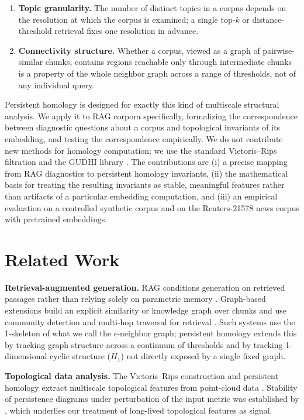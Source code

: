 \documentclass[11pt]{article}
\begin{document}
\begin{enumerate}
\item \textbf{Topic granularity.} The number of distinct topics in a corpus depends on the resolution at which the corpus is examined; a single top-$k$ or distance-threshold retrieval fixes one resolution in advance.
\item \textbf{Connectivity structure.} Whether a corpus, viewed as a graph of pairwise-similar chunks, contains regions reachable only through intermediate chunks is a property of the whole neighbor graph across a range of thresholds, not of any individual query.
\end{enumerate}

Persistent homology \citep{edelsbrunner2008persistent, zomorodian2005computing} is designed for exactly this kind of multiscale structural analysis. We apply it to RAG corpora specifically, formalizing the correspondence between diagnostic questions about a corpus and topological invariants of its embedding, and testing the correspondence empirically. We do not contribute new methods for homology computation; we use the standard Vietoris--Rips filtration and the GUDHI library \citep{gudhi2014}. The contributions are (i) a precise mapping from RAG diagnostics to persistent homology invariants, (ii) the mathematical basis for treating the resulting invariants as stable, meaningful features rather than artifacts of a particular embedding computation, and (iii) an empirical evaluation on a controlled synthetic corpus and on the Reuters-21578 news corpus with pretrained embeddings.

\section{Related Work}

\textbf{Retrieval-augmented generation.} RAG conditions generation on retrieved passages rather than relying solely on parametric memory \citep{lewis2020retrieval}. Graph-based extensions build an explicit similarity or knowledge graph over chunks and use community detection and multi-hop traversal for retrieval \citep{edge2024graphrag}. Such systems use the 1-skeleton of what we call the $\epsilon$-neighbor graph; persistent homology extends this by tracking graph structure across a continuum of thresholds and by tracking 1-dimensional cyclic structure ($H_1$) not directly exposed by a single fixed graph.

\textbf{Topological data analysis.} The Vietoris--Rips construction and persistent homology extract multiscale topological features from point-cloud data \citep{edelsbrunner2008persistent, zomorodian2005computing, carlsson2009topology}. Stability of persistence diagrams under perturbation of the input metric was established by \citet{cohen2007stability}, which underlies our treatment of long-lived topological features as signal.
\end{document}
